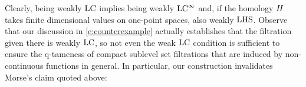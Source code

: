 Clearly, being weakly $\mathrm{LC}$ implies being weakly $\mathrm{LC}^\infty$ and, if the homology $H$ takes finite dimensional values on one-point spaces, also weakly $\mathrm{LHS}$.
Observe that our discussion in \cref{e:counterexample} actually establishes that the filtration given there is weakly $\mathrm{LC}$, so not even the weak $\mathrm{LC}$ condition is sufficient to ensure the q-tameness of compact sublevel set filtrations that are induced by non-continuous functions in general.
In particular, our construction invalidates Morse's claim quoted above:
%
